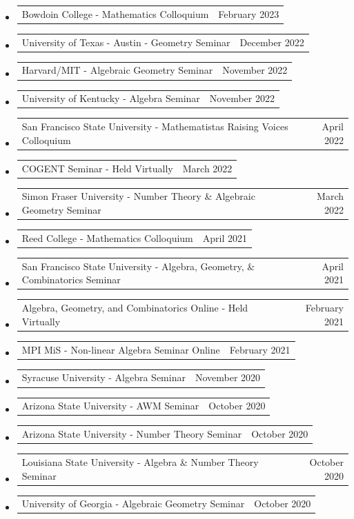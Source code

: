 \documentclass[letterpaper,11pt]{article}
\makeatletter
\newcommand{\ressubheadingTalk}[2]{
\begin{tabular*}{6.5in}[t]{l@{\cftdotfill{\cftsecdotsep}\extracolsep{\fill}}r}
		#1 & #2 \\
\end{tabular*}\vspace{-6pt}}
\makeatother
\begin{document}
\begin{itemize}
\item
	\ressubheadingTalk{Bowdoin College - Mathematics Colloquium}{February 2023}

\item
	\ressubheadingTalk{University of Texas - Austin - Geometry Seminar}{December 2022}
	
\item
	\ressubheadingTalk{Harvard/MIT - Algebraic Geometry Seminar}{November 2022}
	
\item
	\ressubheadingTalk{University of Kentucky - Algebra Seminar}{November 2022}
		
\item
	\ressubheadingTalk{San Francisco State University - Mathematistas Raising Voices Colloquium}{April 2022}

\item
	\ressubheadingTalk{COGENT Seminar - Held Virtually}{March 2022}
	
\item
	\ressubheadingTalk{Simon Fraser University - Number Theory \& Algebraic Geometry Seminar}{March 2022}
	
\item
	\ressubheadingTalk{Reed College - Mathematics Colloquium}{April 2021}
	
\item
	\ressubheadingTalk{San Francisco State University - Algebra, Geometry, \& Combinatorics Seminar}{April 2021}
	
\item
	\ressubheadingTalk{Algebra, Geometry, and Combinatorics Online - Held Virtually}{February 2021}
	
\item
	\ressubheadingTalk{MPI MiS - Non-linear Algebra Seminar Online}{February 2021}
	
\item
	\ressubheadingTalk{Syracuse University - Algebra Seminar}{November 2020}
	
\item
	\ressubheadingTalk{Arizona State University - AWM Seminar}{October 2020}

\item
	\ressubheadingTalk{Arizona State University - Number Theory Seminar}{October 2020}

\item
	\ressubheadingTalk{Louisiana State University - Algebra \& Number Theory Seminar}{October 2020}
		
\item
	\ressubheadingTalk{University of Georgia - Algebraic Geometry Seminar}{October 2020}
	

\end{itemize}
\end{document}
